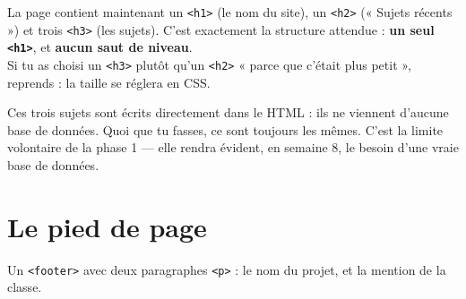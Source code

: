 \documentclass[a4paper,11pt]{article}
\begin{document}
\begin{tcolorbox}[attention, title={Vérifie ta hiérarchie de titres}]
La page contient maintenant un \texttt{<h1>} (le nom du site), un \texttt{<h2>} (« Sujets récents ») et trois \texttt{<h3>} (les sujets). C'est exactement la structure attendue : \textbf{un seul \texttt{<h1>}}, et \textbf{aucun saut de niveau}.\\[4pt]
Si tu as choisi un \texttt{<h3>} plutôt qu'un \texttt{<h2>} « parce que c'était plus petit », reprends : la taille se réglera en CSS.
\end{tcolorbox}

\begin{tcolorbox}[astuce, title={« Codé en dur » --- pourquoi ?}]
Ces trois sujets sont écrits directement dans le HTML : ils ne viennent d'aucune base de données. Quoi que tu fasses, ce sont toujours les mêmes. C'est la limite volontaire de la phase 1 --- elle rendra évident, en semaine 8, le besoin d'une vraie base de données.
\end{tcolorbox}

\section{Le pied de page}

\vspace{2pt}
\begin{center}
\end{center}

\begin{tcolorbox}[definition, title={À produire}]
Un \texttt{<footer>} avec deux paragraphes \texttt{<p>} : le nom du projet, et la mention de la classe.
\end{tcolorbox}
\end{document}

